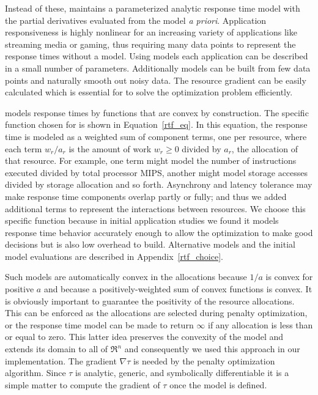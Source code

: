 Instead of these, \pacora maintains a parameterized analytic response time model with the partial derivatives evaluated from the model \emph{a priori}. Application responsiveness is highly nonlinear for an increasing variety of applications like streaming media or gaming, thus requiring many data points to represent the response times without a model. Using models each application can be described in a small number of parameters.  Additionally models can be built from few data points and naturally smooth out noisy data. The resource gradient can be easily calculated which is essential for \pacora to solve the optimization problem efficiently.

\pacora models response times by functions that are convex by construction.  The specific function chosen for \pacora is shown in Equation~\ref{rtf_eq}.  In this equation, the response time is modeled as a weighted sum of component terms, one per resource, where each term $w_r/a_r$ is the amount of work $w_r \geq 0$ divided by $a_r$, the allocation of that resource\cite{Snav}. For example, one term might model the number of instructions executed divided by total processor MIPS, another might model storage accesses divided by storage allocation and so forth. Asynchrony and latency tolerance may make response time components overlap partly or fully; and thus we added additional terms to represent the interactions between resources. We choose this specific function because in initial application studies we found it models response time behavior accurately enough to allow the optimization to make good decisions but is also low overhead to build.  Alternative models and the initial model evaluations are described in Appendix~\ref{rtf_choice}.

Such models are automatically convex in the allocations because $1/a$ is convex for positive $a$ and because a positively-weighted sum of convex functions is convex.  It is obviously important to guarantee the positivity of the resource allocations. This can be enforced as the allocations are selected during penalty optimization, or the response time model can be made to return $\infty$ if any allocation is less than or equal to zero. This latter idea preserves the convexity of the model and extends its domain to all of $\Re^n$ and consequently we used this approach in our implementation. The gradient $\nabla\tau$ is needed by the penalty optimization algorithm.
Since $\tau$ is analytic, generic, and symbolically differentiable
it is a simple matter to compute the gradient of $\tau$ once the model is defined.

